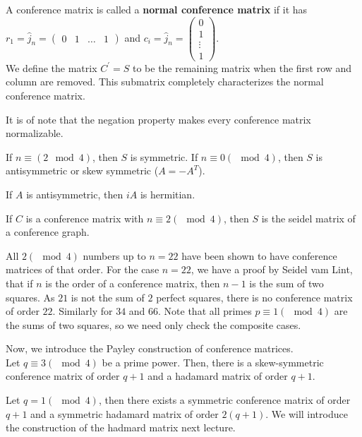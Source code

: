 \begin{definition}
A conference matrix is called a \textbf{normal conference matrix} if it has \(r_1 = \hat{j}_{n} =
\begin{pmatrix}
	0 & 1 & \ldots & 1
\end{pmatrix}\)	and \(c_{i} = \hat{j}_{n} = \begin{pmatrix} 0\\ 1 \\ \vdots\\ 1 \end{pmatrix}\).\\
We define the matrix \(C^{\prime} = S\) to be the remaining matrix when the first row and column are removed. This submatrix completely characterizes the normal conference matrix.
\end{definition}
It is of note that the negation property makes every conference matrix normalizable.
\begin{proposition}
		If \(n \equiv \left( 2 \mod 4 \right) \), then \(S\) is symmetric. If \(n \equiv 0 \left( \mod 4 \right) \), then \(S\) is antisymmetric or skew symmetric (\(A = - A^{T}\)).
\end{proposition}
\begin{remark}
	If \(A\) is antisymmetric, then \(iA\) is hermitian.
\end{remark}
\begin{proposition}
If \(C\) is a conference matrix with \(n \equiv 2 \left( \mod 4 \right) \), then \(S\) is the seidel matrix of a conference graph.
\end{proposition}
\begin{remark}
	All \(2 \left( \mod 4 \right) \) numbers up to \(n = 22\) have been shown to have conference matrices of that order. For the case \(n= 22\), we have a proof by Seidel vam Lint, that if \(n\) is the order of a conference matrix, then \(n-1\) is the sum of two squares. As \(21\) is not the sum of \(2\) perfect squares, there is no conference matrix of order \(22\). Similarly for \(34\) and \(66\). Note that all primes \(p \equiv 1\left( \mod  4 \right) \) are the sums of two squares, so we need only check the composite cases.
\end{remark}
Now, we introduce the Payley construction of conference matrices.\\
Let \(q \equiv 3 \left( \mod 4 \right) \) be a prime power. Then, there is a skew-symmetric conference matrix of order \(q + 1\) and a hadamard matrix of order \(q + 1\).\\
\begin{proposition}
	Let \(q = 1 \left( \mod 4 \right) \), then there exists a symmetric conference matrix of order \(q+1\) and a symmetric hadamard matrix of order \(2\left( q+1 \right) \). We will introduce the construction of the hadmard matrix next lecture.
\end{proposition}
